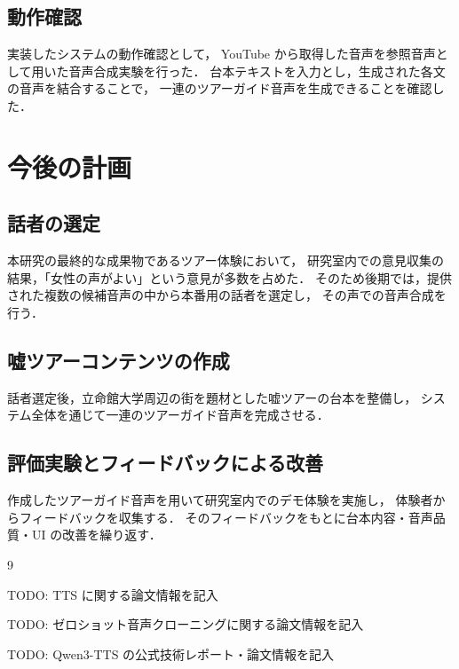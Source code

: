 \documentclass[uplatex,a4paper,10pt,twocolumn]{jsarticle}
\begin{document}
\subsection{動作確認}

実装したシステムの動作確認として，
YouTube から取得した音声を参照音声として用いた音声合成実験を行った．
台本テキストを入力とし，生成された各文の音声を結合することで，
一連のツアーガイド音声を生成できることを確認した．

\section{今後の計画}

\subsection{話者の選定}

本研究の最終的な成果物であるツアー体験において，
研究室内での意見収集の結果，「女性の声がよい」という意見が多数を占めた．
そのため後期では，提供された複数の候補音声の中から本番用の話者を選定し，
その声での音声合成を行う．

\subsection{嘘ツアーコンテンツの作成}

話者選定後，立命館大学周辺の街を題材とした嘘ツアーの台本を整備し，
システム全体を通じて一連のツアーガイド音声を完成させる．

\subsection{評価実験とフィードバックによる改善}

作成したツアーガイド音声を用いて研究室内でのデモ体験を実施し，
体験者からフィードバックを収集する．
そのフィードバックをもとに台本内容・音声品質・UI の改善を繰り返す．


\begin{thebibliography}{9}


    TODO: TTS に関する論文情報を記入

    TODO: ゼロショット音声クローニングに関する論文情報を記入

    TODO: Qwen3-TTS の公式技術レポート・論文情報を記入

\end{thebibliography}
\end{document}
